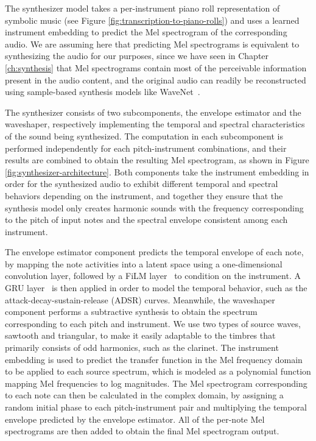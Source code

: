 The synthesizer model takes a per-instrument piano roll representation of symbolic music (see Figure \ref{fig:transcription-to-piano-rolls}) and uses a learned instrument embedding to predict the Mel spectrogram of the corresponding audio.
We are assuming here that predicting Mel spectrograms is equivalent to synthesizing the audio for our purposes, since we have seen in Chapter \ref{ch:synthesis} that Mel spectrograms contain most of the perceivable information present in the audio content, and the original audio can readily be reconstructed using sample-based synthesis models like WaveNet~\cite{oord2016wavenet}.

The synthesizer consists of two subcomponents, the envelope estimator and the waveshaper, respectively implementing the temporal and spectral characteristics of the sound being synthesized.
The computation in each subcomponent is performed independently for each pitch-instrument combinations, and their results are combined to obtain the resulting Mel spectrogram, as shown in Figure \ref{fig:synthesizer-architecture}.
Both components take the instrument embedding in order for the synthesized audio to exhibit different temporal and spectral behaviors depending on the instrument, and together they ensure that the synthesis model only creates harmonic sounds with the frequency corresponding to the pitch of input notes and the spectral envelope consistent among each instrument.

The envelope estimator component predicts the temporal envelope of each note, by mapping the note activities into a latent space using a one-dimensional convolution layer, followed by a FiLM layer~\cite{perez2018film} to condition on the instrument.
A GRU layer~\cite{cho2014seq2seq} is then applied in order to model the temporal behavior, such as the attack-decay-sustain-release (ADSR) curves.
Meanwhile, the waveshaper component performs a subtractive synthesis to obtain the spectrum corresponding to each pitch and instrument.
We use two types of source waves, sawtooth and triangular, to make it easily adaptable to the timbres that primarily consists of odd harmonics, such as the clarinet.
The instrument embedding is used to predict the transfer function in the Mel frequency domain to be applied to each source spectrum, which is modeled as a polynomial function mapping Mel frequencies to log magnitudes.
The Mel spectrogram corresponding to each note can then be calculated in the complex domain, by assigning a random initial phase to each pitch-instrument pair and multiplying the temporal envelope predicted by the envelope estimator.
All of the per-note Mel spectrograms are then added to obtain the final Mel spectrogram output.



